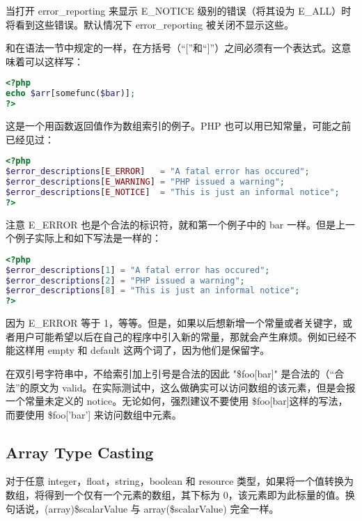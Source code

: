 当打开 error\_reporting 来显示 E\_NOTICE 级别的错误（将其设为 E\_ALL）时将看到这些错误。默认情况下 error\_reporting 被关闭不显示这些。

和在语法一节中规定的一样，在方括号（“[”和“]”）之间必须有一个表达式。这意味着可以这样写：


\begin{lstlisting}[language=PHP]
<?php
echo $arr[somefunc($bar)];
?>
\end{lstlisting}


这是一个用函数返回值作为数组索引的例子。PHP 也可以用已知常量，可能之前已经见过：





\begin{lstlisting}[language=PHP]
<?php
$error_descriptions[E_ERROR]   = "A fatal error has occured";
$error_descriptions[E_WARNING] = "PHP issued a warning";
$error_descriptions[E_NOTICE]  = "This is just an informal notice";
?>
\end{lstlisting}

注意 E\_ERROR 也是个合法的标识符，就和第一个例子中的 bar 一样。但是上一个例子实际上和如下写法是一样的：



\begin{lstlisting}[language=PHP]
<?php
$error_descriptions[1] = "A fatal error has occured";
$error_descriptions[2] = "PHP issued a warning";
$error_descriptions[8] = "This is just an informal notice";
?>
\end{lstlisting}

因为 E\_ERROR 等于 1，等等。但是，如果以后想新增一个常量或者关键字，或者用户可能希望以后在自己的程序中引入新的常量，那就会产生麻烦。例如已经不能这样用 empty 和 default 这两个词了，因为他们是保留字。

在双引号字符串中，不给索引加上引号是合法的因此 "\$foo[bar]" 是合法的（“合法”的原文为 valid。在实际测试中，这么做确实可以访问数组的该元素，但是会报一个常量未定义的 notice。无论如何，强烈建议不要使用 \$foo[bar]这样的写法，而要使用 \$foo['bar'] 来访问数组中元素。


\subsection{Array Type Casting}

对于任意 integer，float，string，boolean 和 resource 类型，如果将一个值转换为数组，将得到一个仅有一个元素的数组，其下标为 0，该元素即为此标量的值。换句话说，(array)\$scalarValue 与 array(\$scalarValue) 完全一样。

